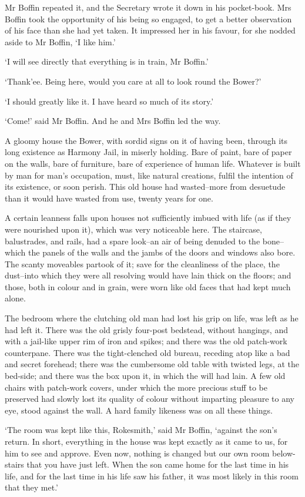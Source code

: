 Mr Boffin repeated it, and the Secretary wrote it down in his
pocket-book. Mrs Boffin took the opportunity of his being so engaged,
to get a better observation of his face than she had yet taken. It
impressed her in his favour, for she nodded aside to Mr Boffin, ‘I like
him.’

‘I will see directly that everything is in train, Mr Boffin.’

‘Thank’ee. Being here, would you care at all to look round the Bower?’

‘I should greatly like it. I have heard so much of its story.’

‘Come!’ said Mr Boffin. And he and Mrs Boffin led the way.

A gloomy house the Bower, with sordid signs on it of having been,
through its long existence as Harmony Jail, in miserly holding. Bare of
paint, bare of paper on the walls, bare of furniture, bare of experience
of human life. Whatever is built by man for man’s occupation, must,
like natural creations, fulfil the intention of its existence, or soon
perish. This old house had wasted--more from desuetude than it would
have wasted from use, twenty years for one.

A certain leanness falls upon houses not sufficiently imbued with life
(as if they were nourished upon it), which was very noticeable here.
The staircase, balustrades, and rails, had a spare look--an air of being
denuded to the bone--which the panels of the walls and the jambs of the
doors and windows also bore. The scanty moveables partook of it; save
for the cleanliness of the place, the dust--into which they were all
resolving would have lain thick on the floors; and those, both in colour
and in grain, were worn like old faces that had kept much alone.

The bedroom where the clutching old man had lost his grip on life, was
left as he had left it. There was the old grisly four-post bedstead,
without hangings, and with a jail-like upper rim of iron and spikes; and
there was the old patch-work counterpane. There was the tight-clenched
old bureau, receding atop like a bad and secret forehead; there was the
cumbersome old table with twisted legs, at the bed-side; and there
was the box upon it, in which the will had lain. A few old chairs with
patch-work covers, under which the more precious stuff to be preserved
had slowly lost its quality of colour without imparting pleasure to any
eye, stood against the wall. A hard family likeness was on all these
things.

‘The room was kept like this, Rokesmith,’ said Mr Boffin, ‘against the
son’s return. In short, everything in the house was kept exactly as it
came to us, for him to see and approve. Even now, nothing is changed
but our own room below-stairs that you have just left. When the son came
home for the last time in his life, and for the last time in his life
saw his father, it was most likely in this room that they met.’


